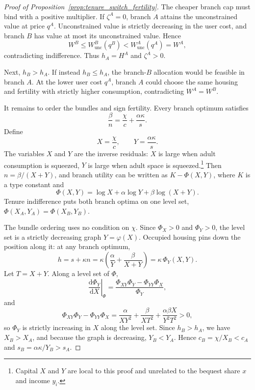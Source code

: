 \documentclass[11pt]{article}
\newcommand{\dd}{\mathrm d}
\newcommand{\1}{\mathbf 1}
\begin{document}
\begin{proof}[Proof of Proposition~\ref{prop:tenure_switch_fertility}]
The cheaper branch cap must bind with a positive multiplier. If $\zeta^A=0$, branch $A$ attains the unconstrained value at price $q^A$. Unconstrained value is strictly decreasing in the user cost, and branch $B$ has value at most its unconstrained value. Hence
\[
W^B\le W^B_{\mathrm{unc}}(q^B)<W^A_{\mathrm{unc}}(q^A)=W^A,
\]
contradicting indifference. Thus $h_A=H^A$ and $\zeta^A>0$.

Next, $h_B>h_A$. If instead $h_B\le h_A$, the branch-$B$ allocation would be feasible in branch $A$. At the lower user cost $q^A$, branch $A$ could choose the same housing and fertility with strictly higher consumption, contradicting $W^A=W^B$.

It remains to order the bundles and sign fertility. Every branch optimum satisfies
\[
\frac{\beta}{n}=\frac{\chi}{c}+\frac{\alpha\kappa}{s}.
\]
Define
\[
X=\frac{\chi}{c},
\qquad
Y=\frac{\alpha\kappa}{s}.
\]
The variables $X$ and $Y$ are the inverse residuals: $X$ is large when adult consumption is squeezed, $Y$ is large when adult space is squeezed.\footnote{Capital $X$ and $Y$ are local to this proof and unrelated to the bequest share $x$ and income $y_i$.}
Then $n=\beta/(X+Y)$, and branch utility can be written as $K-\Phi(X,Y)$, where $K$ is a type constant and
\[
\Phi(X,Y)=\log X+\alpha\log Y+\beta\log(X+Y).
\]
Tenure indifference puts both branch optima on one level set, $\Phi(X_A,Y_A)=\Phi(X_B,Y_B)$.

The bundle ordering uses no condition on $\chi$. Since $\Phi_X>0$ and $\Phi_Y>0$, the level set is a strictly decreasing graph $Y=\varphi(X)$. Occupied housing pins down the position along it: at any branch optimum,
\[
h=s+\kappa n
=
\kappa\left(\frac{\alpha}{Y}+\frac{\beta}{X+Y}\right)
=
\kappa\,\Phi_Y(X,Y).
\]
Let $T=X+Y$. Along a level set of $\Phi$,
\[
\left.\frac{\dd \Phi_Y}{\dd X}\right|_\Phi
=
\frac{\Phi_{XY}\Phi_Y-\Phi_{YY}\Phi_X}{\Phi_Y},
\]
and
\[
\Phi_{XY}\Phi_Y-\Phi_{YY}\Phi_X
=
\frac{\alpha}{XY^2}
+
\frac{\beta}{XT^2}
+
\frac{\alpha\beta X}{Y^2T^2}
>0,
\]
so $\Phi_Y$ is strictly increasing in $X$ along the level set. Since $h_B>h_A$, we have $X_B>X_A$, and because the graph is decreasing, $Y_B<Y_A$. Hence $c_B=\chi/X_B<c_A$ and $s_B=\alpha\kappa/Y_B>s_A$.


\end{proof}
\end{document}
